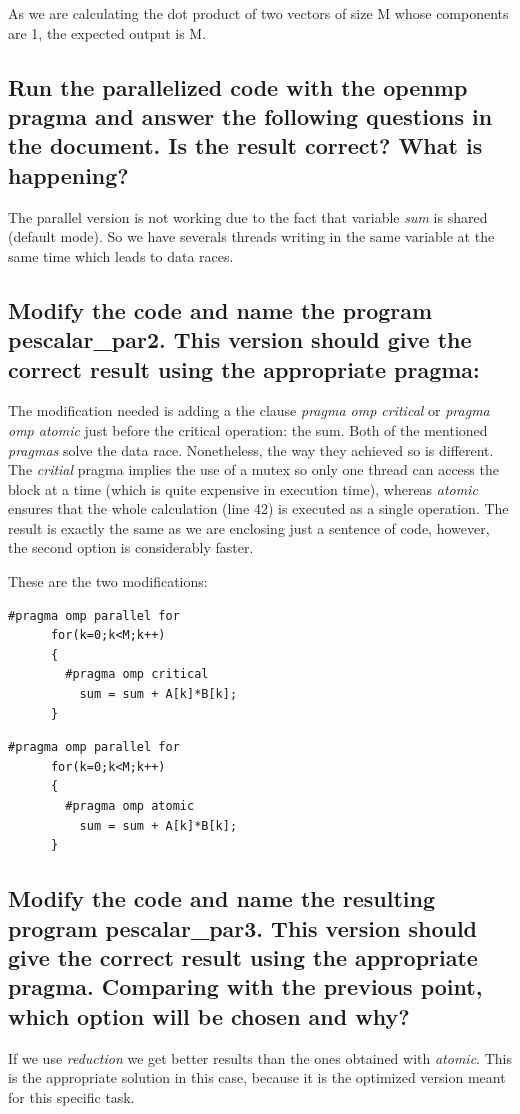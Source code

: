 \documentclass{article}
\newcommand{\question}[1]{\subsection{#1}}
\begin{document}
As we are calculating the dot product of two vectors of size M whose components are 1, the expected output is M.
    
\question{Run the parallelized code with the openmp pragma and answer the following questions in the document. Is the result correct? What is happening?}
    
The parallel version is not working due to the fact that variable \emph{sum} is shared (default mode). So we have severals threads writing in the same variable at the same time which leads to data races.

\question{Modify the code and name the program pescalar\_par2. This version should give the correct result using the appropriate pragma:}

The modification needed is adding a the clause \emph{pragma omp critical} or \emph{pragma omp atomic} just before the critical operation: the sum.
Both of the mentioned \emph{pragmas} solve the data race. Nonetheless, the way they achieved so is different. The \emph{critial} pragma implies the use of a mutex so only one thread can access the block at a time (which is quite expensive in execution time), whereas \emph{atomic} ensures that the whole calculation (line 42) is executed as a single operation. The result is exactly the same as we are enclosing just a sentence of code, however, the second option is considerably faster.

These are the two modifications:

\begin{lstlisting}[texcl=true]
    #pragma omp parallel for 
      for(k=0;k<M;k++)
      {	
        #pragma omp critical
          sum = sum + A[k]*B[k];
      } 
\end{lstlisting}

\begin{lstlisting}[texcl=true]
    #pragma omp parallel for 
      for(k=0;k<M;k++)
      {	
        #pragma omp atomic
          sum = sum + A[k]*B[k];
      } 
\end{lstlisting}

\question{Modify the code and name the resulting program pescalar\_par3. This version should give the correct result using the appropriate pragma. Comparing with the previous point, which option will be chosen and why?}

If we use \emph{reduction} we get better results than the ones obtained with \emph{atomic}. This is the appropriate solution in this case, because it is the optimized version meant for this specific task.
\end{document}
